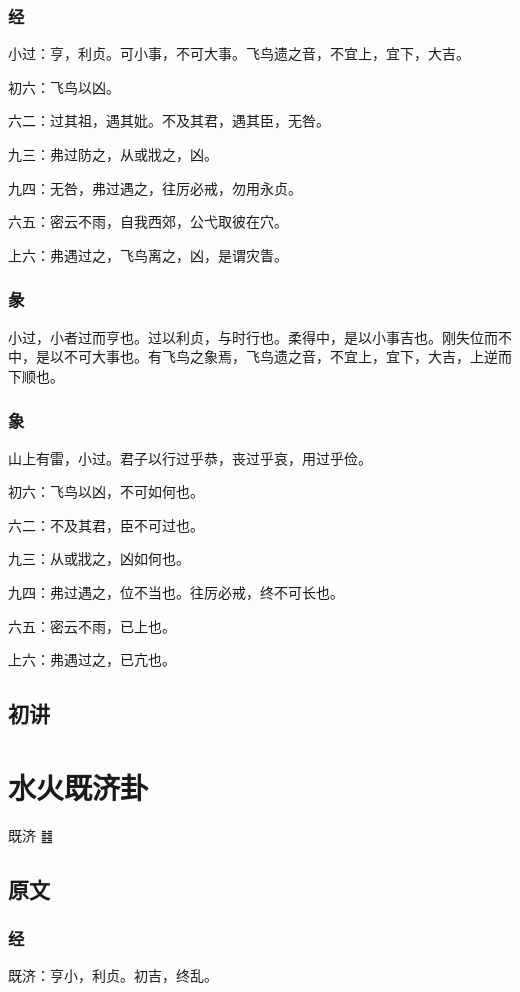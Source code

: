 \documentclass[12pt,oneside]{book}
\begin{document}
\subsection{经}
小过：亨，利贞。可小事，不可大事。飞鸟遗之音，不宜上，宜下，大吉。

初六：飞鸟以凶。

六二：过其祖，遇其妣。不及其君，遇其臣，无咎。

九三：弗过防之，从或戕之，凶。

九四：无咎，弗过遇之，往厉必戒，勿用永贞。

六五：密云不雨，自我西郊，公弋取彼在穴。

上六：弗遇过之，飞鸟离之，凶，是谓灾眚。

\subsection{彖}
小过，小者过而亨也。过以利贞，与时行也。柔得中，是以小事吉也。刚失位而不中，是以不可大事也。有飞鸟之象焉，飞鸟遗之音，不宜上，宜下，大吉，上逆而下顺也。

\subsection{象}
山上有雷，小过。君子以行过乎恭，丧过乎哀，用过乎俭。

初六：飞鸟以凶，不可如何也。

六二：不及其君，臣不可过也。

九三：从或戕之，凶如何也。

九四：弗过遇之，位不当也。往厉必戒，终不可长也。

六五：密云不雨，已上也。

上六：弗遇过之，已亢也。

\section{初讲}



\chapter{水火既济卦}
既济 {\Large ䷾}

\section{原文}

\subsection{经}
既济：亨小，利贞。初吉，终乱。
\end{document}
